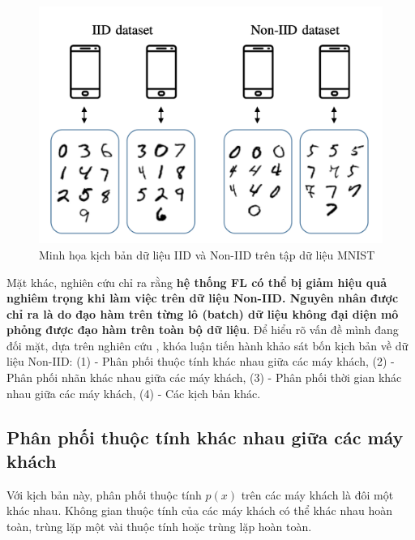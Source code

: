 \begin{figure}
    \centering
    \includegraphics[scale=0.7]{../images/iid_vs_noniid.png}
    \caption{Minh họa kịch bản dữ liệu IID và Non-IID trên tập dữ liệu MNIST \cite{hellstrom2020wireless}}
    \label{fig:iid_noniid}
\end{figure}


Mặt khác, nghiên cứu \cite{zhao2018federated} chỉ ra rằng \textbf{hệ thống FL có thể bị giảm hiệu quả nghiêm trọng khi làm việc trên dữ liệu Non-IID. Nguyên nhân được chỉ ra là do đạo hàm trên từng lô (batch) dữ liệu không đại diện mô phỏng được đạo hàm trên toàn bộ dữ liệu}. Để hiểu rõ vấn đề mình đang đối mặt, dựa trên nghiên cứu \cite{zhu2021federated}, khóa luận tiến hành khảo sát bốn kịch bản về dữ liệu Non-IID: (1) - Phân phối thuộc tính khác nhau giữa các máy khách, (2) - Phân phối nhãn khác nhau giữa các máy khách, (3) - Phân phối thời gian khác nhau giữa các máy khách, (4) - Các kịch bản khác.

\subsection{Phân phối thuộc tính khác nhau giữa các máy khách}

Với kịch bản này, phân phối thuộc tính $p(x)$ trên các máy khách là đôi một khác nhau. Không gian thuộc tính của các máy khách có thể khác nhau hoàn toàn, trùng lặp một vài thuộc tính hoặc trùng lặp hoàn toàn.

